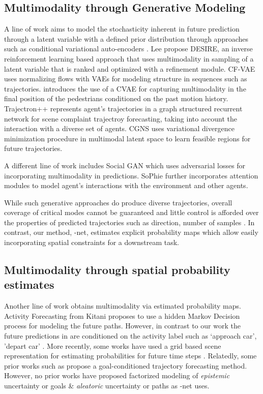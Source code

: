 \documentclass[final]{cvpr}
\begin{document}
\subsection{Multimodality through Generative Modeling}
A line of work aims to model the stochasticity inherent in future prediction through a latent variable with a defined prior distribution through approaches such as conditional variational auto-encoders \cite{kingma2013auto}. Lee \etal \cite{lee2017desire} propose DESIRE, an inverse reinforcement learning based approach that uses multimodality in sampling of a latent variable that is ranked and optimized with a refinement module. CF-VAE \cite{bhattacharyya2019conditional} uses normalizing flows with VAEs for modeling structure in sequences such as trajectories. \cite{mangalam2020disentangling} introduces the use of a CVAE for capturing multimodality in the final position of the pedestrians conditioned on the past motion history. Trajectron++ \cite{salzmann2020trajectron++} represents agent's trajectories in a graph structured recurrent network for scene complaint trajectroy forecasting, taking into account the interaction with a diverse set of agents. CGNS \cite{li2019conditional} uses variational divergence minimization procedure in multimodal latent space to learn feasible regions for future trajectories.

A different line of work includes Social GAN \cite{gupta2018social} which uses adversarial losses \cite{goodfellow2014generative} for incorporating multimodality in predictions. SoPhie \cite{sadeghian2019sophie} further incorporates attention modules to model agent's interactions with the environment and other agents.

While such generative approaches do produce diverse trajectories, overall coverage of critical modes cannot be guaranteed and little control is afforded over the properties of predicted trajectories such as direction, number of samples \etc. In contrast, our method, -net, estimates explicit probability maps which allow easily incorporating spatial constraints for a downstream task.  

\subsection{Multimodality through spatial probability estimates}
Another line of work obtains multimodality via estimated probability maps. Activity Forecasting from Kitani \etal \cite{kitani2012activity} proposes to use a hidden Markov Decision process for modeling the future paths. However, in contrast to our work the future predictions in \cite{kitani2012activity} are conditioned on the activity label such as `approach car', 'depart car' \etc. More recently, some works have used a grid based scene representation for estimating probabilities for future time steps \cite{liang2020simaug, liang2020garden, deo2020trajectory}. Relatedly, some prior works such as \cite{mangalam2020disentangling, zhao2020tnt, caoHMP2020} propose a goal-conditioned trajectory forecasting method. However, no prior works have proposed factorized modeling of \textit{epistemic} uncertainty or goals \& \textit{aleatoric} uncertainty or paths as -net uses. 
\end{document}
